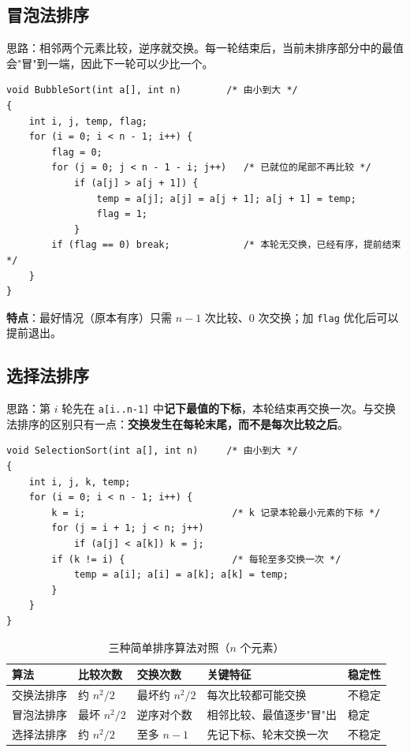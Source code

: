 \subsection{冒泡法排序}
思路：相邻两个元素比较，逆序就交换。每一轮结束后，当前未排序部分中的最值会"冒"到一端，因此下一轮可以少比一个。
\begin{lstlisting}
void BubbleSort(int a[], int n)        /* 由小到大 */
{
    int i, j, temp, flag;
    for (i = 0; i < n - 1; i++) {
        flag = 0;
        for (j = 0; j < n - 1 - i; j++)   /* 已就位的尾部不再比较 */
            if (a[j] > a[j + 1]) {
                temp = a[j]; a[j] = a[j + 1]; a[j + 1] = temp;
                flag = 1;
            }
        if (flag == 0) break;             /* 本轮无交换，已经有序，提前结束 */
    }
}
\end{lstlisting}
\textbf{特点}：最好情况（原本有序）只需 $n-1$ 次比较、0 次交换；加 \texttt{flag} 优化后可以提前退出。

\subsection{选择法排序}
思路：第 $i$ 轮先在 \texttt{a[i..n-1]} 中\textbf{记下最值的下标}，本轮结束再交换一次。与交换法排序的区别只有一点：\textbf{交换发生在每轮末尾，而不是每次比较之后}。
\begin{lstlisting}
void SelectionSort(int a[], int n)     /* 由小到大 */
{
    int i, j, k, temp;
    for (i = 0; i < n - 1; i++) {
        k = i;                          /* k 记录本轮最小元素的下标 */
        for (j = i + 1; j < n; j++)
            if (a[j] < a[k]) k = j;
        if (k != i) {                   /* 每轮至多交换一次 */
            temp = a[i]; a[i] = a[k]; a[k] = temp;
        }
    }
}
\end{lstlisting}

\begin{table}[htbp]
\centering
\caption{三种简单排序算法对照（$n$ 个元素）}
\footnotesize
\begin{tabularx}{\textwidth}{@{}p{2.3cm}p{2.2cm}p{2.3cm}Xp{2.1cm}@{}}
\toprule
算法 & 比较次数 & 交换次数 & 关键特征 & 稳定性 \\
\midrule
交换法排序 & 约 $n^2/2$ & 最坏约 $n^2/2$ & 每次比较都可能交换 & 不稳定 \\
冒泡法排序 & 最坏 $n^2/2$ & 逆序对个数 & 相邻比较、最值逐步"冒"出 & 稳定 \\
选择法排序 & 约 $n^2/2$ & 至多 $n-1$ & 先记下标、轮末交换一次 & 不稳定 \\
\bottomrule
\end{tabularx}
\end{table}

